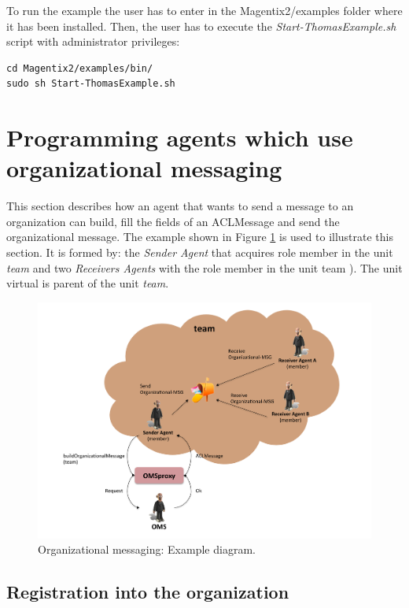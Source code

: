 To run the example the user has to enter in the Magentix2/examples folder where it has been installed. Then, the user has to execute the \textit{Start-ThomasExample.sh} script with administrator privileges:

\begin{lstlisting}
cd Magentix2/examples/bin/
sudo sh Start-ThomasExample.sh
\end{lstlisting}


\section{Programming agents which use organizational messaging}



This section describes how an agent that wants to send a message to an organization
can build, fill the fields of an ACLMessage and send the organizational message.
The example shown in Figure \ref{fig:org1}  is used to illustrate this section. It is formed by: the \textit{Sender Agent} that acquires role member in the unit \textit{team} and two \textit{Receivers Agents} with the role member in the unit team ). The unit virtual is parent of the unit \textit{team}.

\begin{figure}[h!t]
	\centering
	\includegraphics[width=1\textwidth]{Thomas/images/org.pdf}
	\caption{Organizational messaging: Example diagram.}
	\label{fig:org1}
\end{figure}


\subsection{Registration into the organization}


